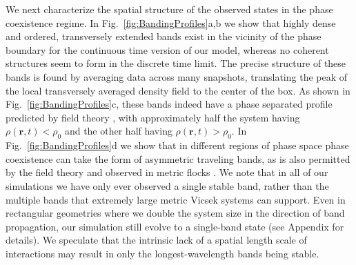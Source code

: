 \documentclass[twoside,twocolumn,9pt]{article}
\begin{document}
We next characterize the spatial structure of the observed states in the phase coexistence regime.
In Fig.~\ref{fig:BandingProfiles}a,b we show that highly dense and ordered, transversely extended bands exist in the vicinity of the phase boundary for the continuous time version of our model, whereas no coherent structures seem to form in the discrete time limit.
The precise structure of these bands is found by averaging data across many snapshots, translating the peak of the local transversely averaged density field to the center of the box.
As shown in Fig.~\ref{fig:BandingProfiles}c, these bands indeed have a phase separated profile predicted by field theory \cite{solon2015pattern}, with approximately half the system having $\rho(\mathbf{r},t)<\rho_{0}$ and the other half having $\rho(\mathbf{r},t)>\rho_{0}$.
In Fig.~\ref{fig:BandingProfiles}d we show that in different regions of phase space phase coexistence can take the form of asymmetric traveling bands, as is also permitted by the field theory \cite{solon2015pattern} and observed in metric flocks \cite{chate2008collective}.
We note that in all of our simulations we have only ever observed a single stable band, rather than the multiple bands that extremely large metric Vicsek systems can support.
Even in rectangular geometries where we double the system size in the direction of band propagation, our simulation still evolve to a single-band state (see Appendix for details).
We speculate that the intrinsic lack of a spatial length scale of interactions may result in only the longest-wavelength bands being stable.
\end{document}
